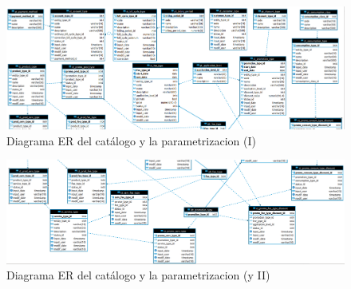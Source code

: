 \begin{landscape}

\begin{figure}[hp!]
  \centering
  \includegraphics[width=1\textwidth]{imaxes/er-catalogo-01.png}          	  \caption{Diagrama ER del catálogo y la parametrizacion (I)}
  \label{fig:er-catalogo-01}
\end{figure}

\begin{figure}[hp!]
  \centering
  \includegraphics[width=1\textwidth]{imaxes/er-catalogo-02.png}
  \caption{Diagrama ER del catálogo y la parametrizacion (y II)}
  \label{fig:er-catalogo-02}
\end{figure}


\end{landscape}

